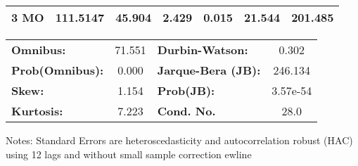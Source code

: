 \begin{center}
\begin{tabular}{lcccccc}
\textbf{3 MO}    &     111.5147  &       45.904     &     2.429  &         0.015        &       21.544    &      201.485     \\
\bottomrule
\end{tabular}
\begin{tabular}{lclc}
\textbf{Omnibus:}       & 71.551 & \textbf{  Durbin-Watson:     } &    0.302  \\
\textbf{Prob(Omnibus):} &  0.000 & \textbf{  Jarque-Bera (JB):  } &  246.134  \\
\textbf{Skew:}          &  1.154 & \textbf{  Prob(JB):          } & 3.57e-54  \\
\textbf{Kurtosis:}      &  7.223 & \textbf{  Cond. No.          } &     28.0  \\
\bottomrule
\end{tabular}
\end{center}

Notes: \newline
 [1] Standard Errors are heteroscedasticity and autocorrelation robust (HAC) using 12 lags and without small sample correction
ewline